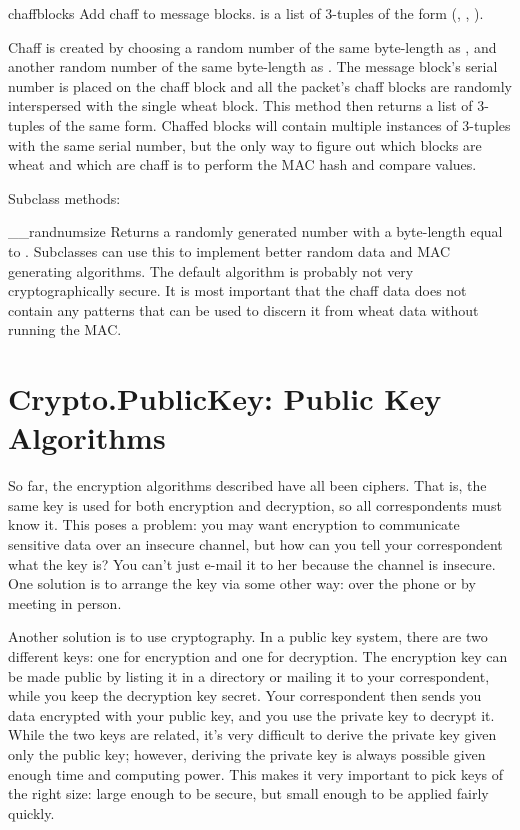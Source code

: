 \documentclass{howto}
\begin{document}
\begin{methoddesc}{chaff}{blocks}
Add chaff to message blocks.   is a list of 3-tuples of the
form (, , ).

Chaff is created by choosing a random number of the same
byte-length as , and another random number of the same
byte-length as .  The message block's serial number is placed
on the chaff block and all the packet's chaff blocks are randomly
interspersed with the single wheat block.  This method then
returns a list of 3-tuples of the same form.  Chaffed blocks will
contain multiple instances of 3-tuples with the same serial
number, but the only way to figure out which blocks are wheat and
which are chaff is to perform the MAC hash and compare values.
\end{methoddesc}

        Subclass methods:

\begin{methoddesc}{__randnum}{size}
Returns a randomly generated number with a byte-length equal
to .  Subclasses can use this to implement better random
data and MAC generating algorithms.  The default algorithm is
probably not very cryptographically secure.  It is most
important that the chaff data does not contain any patterns
that can be used to discern it from wheat data without running 
the MAC.
\end{methoddesc}

\section{Crypto.PublicKey: Public Key Algorithms}
So far, the encryption algorithms described have all been  ciphers.  That is, the same key is used for both encryption and
decryption, so all correspondents must know it.  This poses a problem:
you may want encryption to communicate sensitive data over an insecure
channel, but how can you tell your correspondent what the key is?  You
can't just e-mail it to her because the channel is insecure.  One
solution is to arrange the key via some other way: over the phone or
by meeting in person.

Another solution is to use  cryptography.  In a public
key system, there are two different keys: one for encryption and one for
decryption.  The encryption key can be made public by listing it in a
directory or mailing it to your correspondent, while you keep the
decryption key secret.  Your correspondent then sends you data encrypted
with your public key, and you use the private key to decrypt it.  While
the two keys are related, it's very difficult to derive the private key
given only the public key; however, deriving the private key is always
possible given enough time and computing power.  This makes it very
important to pick keys of the right size: large enough to be secure, but
small enough to be applied fairly quickly.
\end{document}
